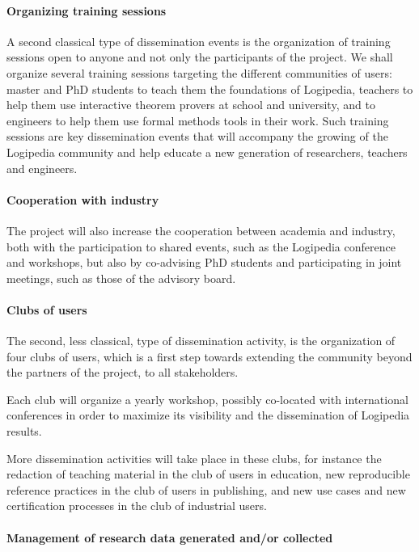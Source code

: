 \paragraph*{Organizing training sessions}

A second classical type of dissemination events is the organization of
training sessions open to anyone and not only the participants of the
project. We shall organize several training sessions targeting the
different communities of users: master and PhD students to teach them
the foundations of Logipedia, teachers to help them use interactive
theorem provers at school and university, and to engineers to help
them use formal methods tools in their work. Such training sessions
are key dissemination events that will accompany the growing of the
Logipedia community and help educate a new generation of researchers,
teachers and engineers.

\paragraph*{Cooperation with industry}

The project will also increase the cooperation between academia and
industry, both with the participation to shared events, such as the
Logipedia conference and workshops, but also by co-advising PhD students
and participating in joint meetings, such as those of the advisory
board.

\paragraph*{Clubs of users}

The second, less classical, type of dissemination activity, is the
organization of four clubs of users, which is a first step towards
extending the community beyond the partners of
the project, to all stakeholders.

Each club will organize a yearly workshop, possibly co-located with
international conferences in order to maximize its visibility
and the dissemination of Logipedia results.

More dissemination activities will take place in these clubs,
for instance the redaction of teaching material in the club of users in
education, new reproducible reference practices in the club of users
in publishing, and new use cases and new certification processes in the
club of industrial users.

\paragraph*{Management of research data generated and/or collected}

